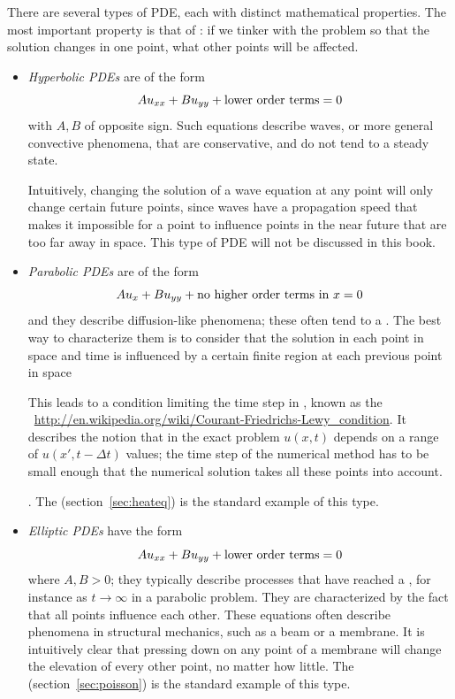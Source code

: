 There are several types of \ac{PDE}, each with distinct mathematical
properties. The most important property is that of : if we tinker with the problem so that the solution
changes in one point, what other points will be affected.
\begin{itemize}
\item \emph{Hyperbolic \acp{PDE}} are of the form
\[ Au_{xx}+Bu_{yy}+\hbox{lower order terms} =0 \]
with $A,B$ of opposite sign. Such equations describe waves,
or more general convective phenomena, that are conservative,
and do not tend to a steady state.

Intuitively, changing the solution of a wave equation at any point
will only change certain future points, since waves have a propagation
speed that makes it impossible for a point to influence points in the
near future that are too far away in space. This type of \ac{PDE} will
not be discussed in this book.
\item \emph{Parabolic \acp{PDE}} are of the form
\[ Au_x+Bu_{yy}+\hbox{no higher order terms in $x$}=0 \]
and they describe diffusion-like phenomena; these often tend to a
. The best way to
characterize them is to consider that the solution in each point in
space and time is influenced by a certain finite region at each
previous point in space
\begin{footnoteenv}
  {This leads to a condition limiting
  the time step in , known as the
  ~\url{http://en.wikipedia.org/wiki/Courant-Friedrichs-Lewy_condition}.
  It describes the notion that in the exact problem $u(x,t)$ depends
  on a range of $u(x',t-\Delta t)$ values; the time step of the
  numerical method has to be small enough that the numerical solution
  takes all these points into account.}
\end{footnoteenv}
. The 
(section~\ref{sec:heateq}) is the standard example of this type.
\item \emph{Elliptic \acp{PDE}} have the form 
\[ Au_{xx}+Bu_{yy}+\hbox{lower order terms} =0 \]
where $A,B>0$; they typically describe processes that have reached a
, for instance as $t\rightarrow\infty$ in a parabolic
problem. They are characterized by the fact that all points influence
each other. These equations often describe phenomena in structural
mechanics, such as a beam or a membrane. It is intuitively clear that
pressing down on any point of a membrane will change the elevation of
every other point, no matter how little. The  (section~\ref{sec:poisson}) is the standard example of
this type.
\end{itemize}

